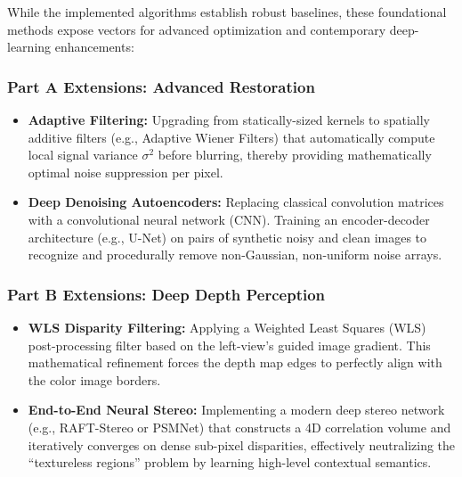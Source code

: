 \documentclass[a4paper,12pt]{article}
\begin{document}
While the implemented algorithms establish robust baselines, these foundational methods expose vectors for advanced optimization and contemporary deep-learning enhancements:

\subsubsection{Part A Extensions: Advanced Restoration}
\begin{itemize}
    \item \textbf{Adaptive Filtering:} Upgrading from statically-sized kernels to spatially additive filters (e.g., Adaptive Wiener Filters) that automatically compute local signal variance $\sigma^2$ before blurring, thereby providing mathematically optimal noise suppression per pixel.
    \item \textbf{Deep Denoising Autoencoders:} Replacing classical convolution matrices with a convolutional neural network (CNN). Training an encoder-decoder architecture (e.g., U-Net) on pairs of synthetic noisy and clean images to recognize and procedurally remove non-Gaussian, non-uniform noise arrays.
\end{itemize}

\subsubsection{Part B Extensions: Deep Depth Perception}
\begin{itemize}
    \item \textbf{WLS Disparity Filtering:} Applying a Weighted Least Squares (WLS) post-processing filter based on the left-view's guided image gradient. This mathematical refinement forces the depth map edges to perfectly align with the color image borders.
    \item \textbf{End-to-End Neural Stereo:} Implementing a modern deep stereo network (e.g., RAFT-Stereo or PSMNet) that constructs a 4D correlation volume and iteratively converges on dense sub-pixel disparities, effectively neutralizing the ``textureless regions'' problem by learning high-level contextual semantics.
\end{itemize}
\end{document}
